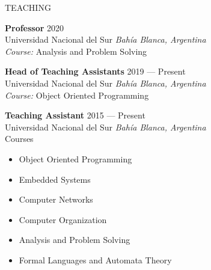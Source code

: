 \documentclass{resume} %
\begin{document}
\begin{rSection}{TEACHING}

\textbf{Professor} \hfill  2020\\
Universidad Nacional del Sur \hfill \textit{Bahía Blanca, Argentina}
\\\textit{Course:} Analysis and Problem Solving


\bigskip
\textbf{Head of Teaching Assistants} \hfill  2019 --- Present\\
Universidad Nacional del Sur \hfill \textit{Bahía Blanca, Argentina}
\\\textit{Course:} Object Oriented Programming


\bigskip
\textbf{Teaching Assistant} \hfill  2015 --- Present\\
Universidad Nacional del Sur \hfill \textit{Bahía Blanca, Argentina}
\\ Courses
\begin{itemize}
    \item Object Oriented Programming\vspace{-0.1cm}
    \item Embedded Systems \vspace{-0.1cm}
    \item Computer Networks   \vspace{-0.1cm}
    \item Computer Organization  \vspace{-0.1cm}
    \item Analysis and Problem Solving  \vspace{-0.1cm}
    \item Formal Languages and Automata Theory
\end{itemize}





\end{rSection}
\end{document}
